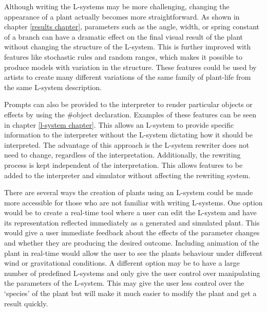 Although writing the L-systems may be more challenging, changing the appearance of a plant actually becomes more straightforward. As shown in chapter \ref{results chapter}, parameters such as the angle, width, or spring constant of a branch can have a dramatic effect on the final visual result of the plant without changing the structure of the L-system. This is further improved with features like stochastic rules and random ranges, which makes it possible to produce models with variation in the structure. These features could be used by artists to create many different variations of the same family of plant-life from the same L-system description.

Prompts can also be provided to the interpreter to render particular objects or effects by using the \#object declaration. Examples of these features can be seen in chapter \ref{l-system chapter}. This allows an L-system to provide specific information to the interpreter without the L-system dictating how it should be interpreted. The advantage of this approach is the L-system rewriter does not need to change, regardless of the interpretation. Additionally, the rewriting process is kept independent of the interpretation. This allows features to be added to the interpreter and simulator without affecting the rewriting system.

There are several ways the creation of plants using an L-system could be made more accessible for those who are not familiar with writing L-systems. One option would be to create a real-time tool where a user can edit the L-system and have its representation reflected immediately as a generated and simulated plant. This would give a user immediate feedback about the effects of the parameter changes and whether they are producing the desired outcome. Including animation of the plant in real-time would allow the user to see the plants behaviour under different wind or gravitational conditions. A different option may be to have a large number of predefined L-systems and only give the user control over manipulating the parameters of the L-system. This may give the user less control over the `species' of the plant but will make it much easier to modify the plant and get a result quickly.


